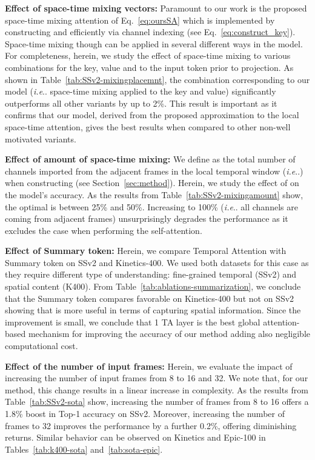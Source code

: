 \documentclass{article}
\makeatletter
\DeclareRobustCommand\onedot{\futurelet\@let@token\@onedot}
\def\@onedot{\ifx\@let@token.\else.\null\fi\xspace}
\def\ie{\emph{i.e}\onedot} \def\Ie{\emph{I.e}\onedot}
\makeatother
\begin{document}
\noindent\textbf{Effect of space-time mixing  vectors:} Paramount to our work is the proposed space-time mixing attention of Eq.~\ref{eq:oursSA} which is implemented by constructing  and  efficiently via channel indexing (see Eq.~\ref{eq:construct_key}). Space-time mixing though can be applied in several different ways in the model. For completeness, herein, we study the effect of space-time mixing to various combinations for the key, value and to the input token prior to  projection. As shown in Table~\ref{tab:SSv2-mixingplacemnt}, the combination corresponding to our model (\ie space-time mixing applied to the key and value) significantly outperforms all other variants by up to 2\%. This result is important as it confirms that our model, derived from the proposed approximation to the local space-time attention, gives the best results when compared to other non-well motivated variants.

\noindent\textbf{Effect of amount of space-time mixing:} We define as  the total number of channels imported from the adjacent frames in the local temporal window  (\ie ) when constructing  (see  Section~\ref{sec:method}). Herein, we study the effect of  on the model's accuracy. As the results from Table~\ref{tab:SSv2-mixingamount} show, the optimal  is between 25\% and 50\%. Increasing  to 100\% (\ie all channels are coming from adjacent frames) unsurprisingly degrades the performance as it excludes the case  when performing the self-attention.

\noindent\textbf{Effect of Summary token:} Herein, we compare Temporal Attention with Summary token on SSv2 and Kinetics-400. We used both datasets for this case as they require different type of understanding: fine-grained temporal (SSv2) and spatial content (K400). From Table~\ref{tab:ablations-summarization}, we conclude that the Summary token compares favorable on Kinetics-400 but not on SSv2 showing that is more useful in terms of capturing spatial information. Since the improvement is small, we conclude that 1 TA layer is the best global attention-based mechanism for improving the accuracy of our method adding also negligible computational cost. 

\noindent\textbf{Effect of the number of input frames:} Herein, we evaluate the impact of increasing the number of input frames  from 8 to 16 and 32. We note that, for our method, this change results in a linear increase in complexity. As the results from Table~\ref{tab:SSv2-sota} show, increasing the number of frames from 8 to 16 offers a 1.8\% boost in Top-1 accuracy on SSv2. Moreover, increasing the number of frames to 32 improves the performance by a further 0.2\%, offering diminishing returns. Similar behavior can be observed on Kinetics and Epic-100 in Tables~\ref{tab:k400-sota} and~\ref{tab:sota-epic}. 
\end{document}
